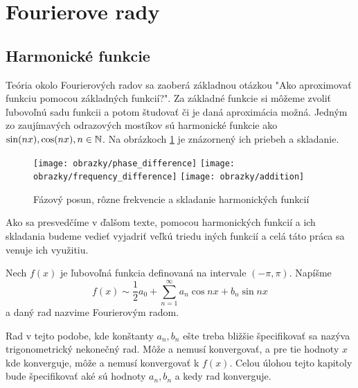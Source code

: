 \section{Fourierove rady}

\subsection{Harmonické funkcie}
Teória okolo Fourierových radov sa zaoberá základnou otázkou "Ako
aproximovať funkciu pomocou základných funkcií?".
Za základné funkcie si môžeme zvoliť ľubovoľnú sadu funkcii a potom
študovať či je daná aproximácia možná. Jedným zo zaujímavých
odrazových mostíkov sú harmonické funkcie ako $\sin(n x), \cos(nx), n
\in \mathbb{N}$.
Na obrázkoch \ref{fig:harmonic_illustration} je znázornený ich priebeh a skladanie.

\begin{figure}[htp]
    \centering
    \texttt{[image: obrazky/phase\_difference]}
    \texttt{[image: obrazky/frequency\_difference]}
    \texttt{[image: obrazky/addition]}
    \caption{Fázový posun, rôzne frekvencie a skladanie harmonických
    funkcií}\label{fig:harmonic_illustration}
\end{figure}

Ako sa presvedčíme v ďalšom texte, pomocou harmonických funkcií a ich
skladania budeme vedieť vyjadriť veľkú triedu iných funkcií a celá
táto práca sa venuje ich využitiu.

\begin{definicia} Nech $f(x)$ je ľubovoľná funkcia definovaná na
intervale $(-\pi,\pi)$. Napíšme
    \begin{equation}
        f(x) \sim \frac{1}{2} a_0 + \sum_{n=1}^{\infty} a_n
        \cos n x + b_n \sin n x
    \label{eq:trig_series}
    \end{equation}
a daný rad nazvime Fourierovým radom.
\end{definicia}

Rad v tejto podobe, kde konštanty $a_n, b_n$ ešte treba bližšie
špecifikovať sa nazýva trigonometrický nekonečný rad. Môže a nemusí
konvergovať, a pre tie hodnoty $x$ kde konverguje, môže a nemusí
konvergovať k $f(x)$. Celou úlohou tejto kapitoly bude špecifikovať
aké sú hodnoty $a_n, b_n$ a kedy rad konverguje.

